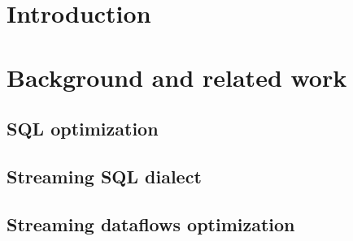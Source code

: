 \documentclass[sigconf]{acmart}
\theoremstyle{remark}
\begin{document}



\maketitle

\thispagestyle{empty}

\section {Introduction}

\section {Background and related work}

\subsection{SQL optimization}

\subsection{Streaming SQL dialect}

\subsection{Streaming dataflows optimization}
\end{document}
